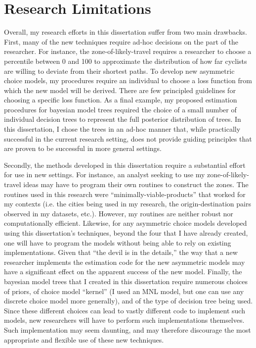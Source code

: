 \section{Research Limitations}
Overall, my research efforts in this dissertation suffer from two main drawbacks. First, many of the new techniques require ad-hoc decisions on the part of the researcher. For instance, the zone-of-likely-travel requires a researcher to choose a percentile between 0 and 100 to approximate the distribution of how far cyclists are willing to deviate from their shortest paths. To develop new asymmetric choice models, my procedures require an individual to choose a loss function from which the new model will be derived. There are few principled guidelines for choosing a specific loss function. As a final example, my proposed estimation procedures for bayesian model trees required the choice of a small number of individual decision trees to represent the full posterior distribution of trees. In this dissertation, I chose the trees in an ad-hoc manner that, while practically successful in the current research setting, does not provide guiding principles that are proven to be successful in more general settings.

Secondly, the methods developed in this dissertation require a substantial effort for use in new settings. For instance, an analyst seeking to use my zone-of-likely-travel ideas may have to program their own routines to construct the zones. The routines used in this research were ``minimally-viable-products'' that worked for my contexts (i.e. the cities being used in my research, the origin-destination pairs observed in my datasets, etc.). However, my routines are neither robust nor computationally efficient. Likewise, for any asymmetric choice models developed using this dissertation's techniques, beyond the four that I have already created, one will have to program the models without being able to rely on existing implementations. Given that ``the devil is in the details,'' the way that a new researcher implements the estimation code for the new asymmetric models may have a significant effect on the apparent success of the new model. Finally, the bayesian model trees that I created in this dissertation require numerous choices of priors, of choice model ``kernel'' (I used an MNL model, but one can use any discrete choice model more generally), and of the type of decision tree being used. Since these different choices can lead to vastly different code to implement such models, new researchers will have to perform such implementations themselves. Such implementation may seem daunting, and may therefore discourage the most appropriate and flexible use of these new techniques.

